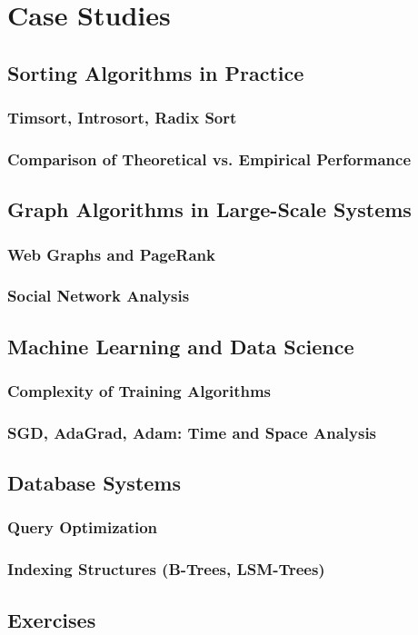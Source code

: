 
\chapter{Case Studies}
\section{Sorting Algorithms in Practice}
\subsection{Timsort, Introsort, Radix Sort}
\subsection{Comparison of Theoretical vs. Empirical Performance}

\section{Graph Algorithms in Large-Scale Systems}
\subsection{Web Graphs and PageRank}
\subsection{Social Network Analysis}

\section{Machine Learning and Data Science}
\subsection{Complexity of Training Algorithms}
\subsection{SGD, AdaGrad, Adam: Time and Space Analysis}

\section{Database Systems}
\subsection{Query Optimization}
\subsection{Indexing Structures (B-Trees, LSM-Trees)}

\section{Exercises}